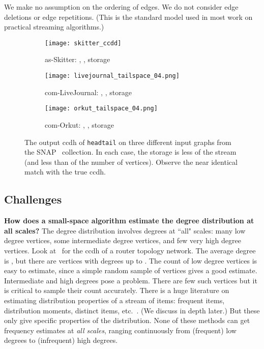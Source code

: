 \documentclass[11pt]{article}
\theoremstyle{definition}
\newcommand{\degdist}{{\tt headtail}}
\begin{document}
We make no assumption on the ordering of edges.
We do not consider edge deletions or edge repetitions. (This is the standard
model used in most work on practical streaming algorithms.)



\begin{figure*}[t]
    \centering
    \begin{subfigure}[b]{0.3\textwidth}
        \centering \texttt{[image: skitter\_ccdd]}
        \caption{as-Skitter: , , storage }
        \label{fig:skitter-ccdh}
    \end{subfigure}
    \hfill
    \begin{subfigure}[b]{0.3\textwidth}
        \centering \texttt{[image: livejournal\_tailspace\_04.png]}
        \caption{com-LiveJournal: , , storage }
        \label{fig:livejournal_tailspace_04}
        \end{subfigure}
    \hfill
    \begin{subfigure}[b]{0.3\textwidth}
        \centering \texttt{[image: orkut\_tailspace\_04.png]}
        \caption{com-Orkut: , , storage }
        \label{fig:orkut_tailspace_04}
    \end{subfigure}
    \caption{The output ccdh of \degdist{} on three different input graphs from
the SNAP~\cite{snap} collection. In each case, the storage is less  of the stream
    (and less than  of the number of vertices). Observe the near identical match
    with the true ccdh.}
    \label{fig:ccdh}
\end{figure*}

\subsection{Challenges}

\textbf{How does a small-space algorithm estimate the degree distribution at all scales?}
 The degree distribution involves degrees at ``all" scales:
many low degree vertices, some intermediate degree vertices, and few very high degree vertices.
Look at~ for the ccdh of a router topology network. The average degree is ,
but there are vertices with degrees up to .
The count of low degree vertices is easy to estimate, since a simple random sample of vertices gives a good estimate.
Intermediate and high degrees pose a problem. There are few such vertices but it is critical to sample
their count accurately. There is a huge literature on estimating distribution properties
of a stream of items: frequent items, distribution moments, distinct items, etc.~\cite{IndykW05,KaneNW10,cormode2008frequent}.
(We discuss in depth later.) But these only give specific properties of the distribution. None of these methods can get frequency estimates at \emph{all scales}, ranging continuously from (frequent)
low degrees to (infrequent) high degrees.
\end{document}
